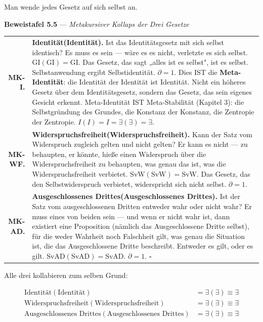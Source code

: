 \documentclass[10pt, openany, oneside]{book}
\renewcommand{\footnotesize}{\fontsize{8.5}{11}\selectfont}
\begin{document}
\vspace{1em}

\noindent Man wende jedes Gesetz auf sich selbst an.

\textbf{Beweistafel 5.5} --- \textit{Metakursiver Kollaps der Drei Gesetze}

\vspace{0.5em}

{\footnotesize
\noindent\begin{tabular}{r p{}}
\textbf{MK-I.} & \textbf{Identität(Identität).} Ist das Identitätsgesetz mit sich selbst identisch? Es muss es sein --- wäre es es nicht, verletzte es sich selbst. $\text{GI}(\text{GI}) = \text{GI}$. Das Gesetz, das sagt „alles ist es selbst", ist es selbst. Selbstanwendung ergibt Selbstidentität. $\partial = 1$. Dies IST die \textbf{Meta-Identität}: die Identität der Identität ist Identität. Nicht ein höheres Gesetz über dem Identitätsgesetz, sondern das Gesetz, das sein eigenes Gesicht erkennt. Meta-Identität IST Meta-Stabilität (Kapitel 3): die Selbstgründung des Grundes, die Konstanz der Konstanz, die Zentropie der Zentropie. $I(I) = I = \exists(\exists) = \exists$. \\[0.3em]
\textbf{MK-WF.} & \textbf{Widerspruchsfreiheit(Widerspruchsfreiheit).} Kann der Satz vom Widerspruch zugleich gelten und nicht gelten? Er kann es nicht --- zu behaupten, er könnte, hieße einen Widerspruch über die Widerspruchsfreiheit zu behaupten, was genau das ist, was die Widerspruchsfreiheit verbietet. $\text{SvW}(\text{SvW}) = \text{SvW}$. Das Gesetz, das den Selbstwiderspruch verbietet, widerspricht sich nicht selbst. $\partial = 1$. \\[0.3em]
\textbf{MK-AD.} & \textbf{Ausgeschlossenes Drittes(Ausgeschlossenes Drittes).} Ist der Satz vom ausgeschlossenen Dritten entweder wahr oder nicht wahr? Er muss eines von beiden sein --- und wenn er nicht wahr ist, dann existiert eine Proposition (nämlich das Ausgeschlossene Dritte selbst), für die weder Wahrheit noch Falschheit gilt, was genau die Situation ist, die das Ausgeschlossene Dritte beschreibt. Entweder es gilt, oder es gilt. $\text{SvAD}(\text{SvAD}) = \text{SvAD}$. $\partial = 1$. $\square$ \\[0.3em]
\end{tabular}
}

\vspace{0.8em}

\noindent Alle drei kollabieren zum selben Grund:

\begin{align*}
\text{Identität}(\text{Identität}) &= \exists(\exists) \equiv \exists \\
\text{Widerspruchsfreiheit}(\text{Widerspruchsfreiheit}) &= \exists(\exists) \equiv \exists \\
\text{Ausgeschlossenes Drittes}(\text{Ausgeschlossenes Drittes}) &= \exists(\exists) \equiv \exists
\end{align*}
\end{document}
